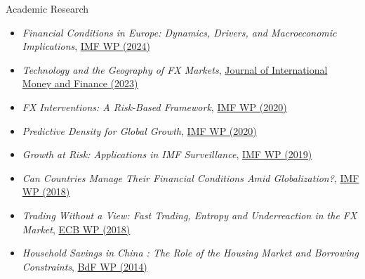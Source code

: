 \documentclass[usegeometry, 10pt, a4paper]{cv} %
\begin{document}
\begin{rubriquetableau}[0.95\textwidth]{Academic Research}\\
  \vspace{-0.8cm}
  \begin{itemize}
  \item \textit{Financial Conditions in Europe: Dynamics, Drivers, and Macroeconomic Implications}, \href{https://www.imf.org/en/Publications/WP/Issues/2023/09/29/Financial-Conditions-in-Europe-Dynamics-Drivers-and-Macroeconomic-Implications-539653}{IMF WP (2024)}
  \item \textit{Technology and the Geography of FX Markets}, \href{https://www.sciencedirect.com/science/article/abs/pii/S0261560623000037}{Journal of International Money and Finance (2023)}
  \item \textit{FX Interventions: A Risk-Based Framework}, \href{https://www.imf.org/en/Publications/WP/Issues/2021/02/12/Foreign-Exchange-Intervention-Rules-for-Central-Banks-A-Risk-based-Framework-50081}{IMF WP (2020)} 
  \item \textit{Predictive Density for Global Growth}, \href{https://www.imf.org/en/Publications/WP/Issues/2020/05/29/Predictive-Density-Aggregation-A-Model-for-Global-GDP-Growth-49441}{IMF WP (2020)} 
  \item \textit{Growth at Risk: Applications in IMF Surveillance}, \href{https://www.imf.org/en/Publications/WP/Issues/2019/02/21/Growth-at-Risk-Concept-and-Application-in-IMF-Country-Surveillance-46567}{IMF WP (2019)} 
  \item \textit{Can Countries Manage Their Financial Conditions Amid Globalization?}, \href{https://www.imf.org/en/Publications/WP/Issues/2018/01/24/Can-Countries-Manage-Their-Financial-Conditions-Amid-Globalization-45581}{IMF WP (2018)} 
  \item \textit{Trading Without a View: Fast Trading, Entropy and Underreaction in the FX  Market}, \href{https://cepr.org/voxeu/columns/fast-trading-and-virtue-entropy}{ECB WP (2018)}
  \item \textit{Household Savings in China : The Role of the Housing Market and Borrowing Constraints}, \href{https://ideas.repec.org/p/pra/mprapa/44611.html}{BdF WP (2014)}  
  \end{itemize}
\end{rubriquetableau}
\end{document}
